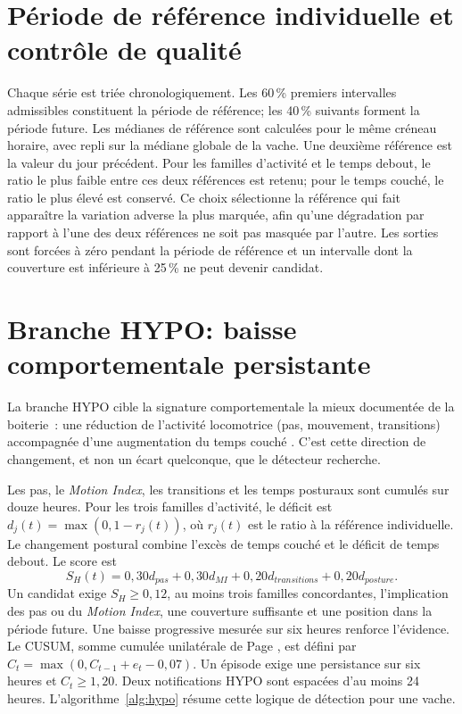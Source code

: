 \section{Période de référence individuelle et contrôle de qualité}

Chaque série est triée chronologiquement. Les 60\,\% premiers intervalles admissibles
constituent la période de référence; les 40\,\% suivants forment la période future. Les médianes de
référence sont calculées pour le même créneau horaire, avec repli sur la médiane globale de
la vache. Une deuxième référence est la valeur du jour précédent. Pour les familles
d'activité et le temps debout, le ratio le plus faible entre ces deux références est retenu;
pour le temps couché, le ratio le plus élevé est conservé. Ce choix sélectionne la référence
qui fait apparaître la variation adverse la plus marquée, afin qu'une dégradation par rapport
à l'une des deux références ne soit pas masquée par l'autre. Les sorties sont forcées
à zéro pendant la période de référence et un intervalle dont la couverture est inférieure à 25\,\% ne
peut devenir candidat.

\section{Branche HYPO: baisse comportementale persistante}
\label{sec:hypo}

La branche HYPO cible la signature comportementale la mieux documentée de la boiterie~: une
réduction de l'activité locomotrice (pas, mouvement, transitions) accompagnée d'une
augmentation du temps couché \citep{ito2010lying,blackie2011lying,chapinal2010measurement}.
C'est cette direction de changement, et non un écart quelconque, que le détecteur recherche.

Les pas, le \textit{Motion Index}, les transitions et les temps posturaux sont cumulés sur
douze heures. Pour les trois familles d'activité, le déficit est
\(
d_j(t)=\max(0,1-r_j(t))
\), où \(r_j(t)\) est le ratio à la référence individuelle. Le changement postural combine
l'excès de temps couché et le déficit de temps debout. Le score est
\[
S_H(t)=0{,}30d_{pas}+0{,}30d_{MI}+0{,}20d_{transitions}+0{,}20d_{posture}.
\]
Un candidat exige \(S_H\geq0{,}12\), au moins trois familles concordantes, l'implication des
pas ou du \textit{Motion Index}, une couverture suffisante et une position dans la période future.
Une baisse progressive mesurée sur six heures renforce l'évidence. Le CUSUM, somme cumulée unilatérale de Page \citep{page1954continuous}, est défini par
\(C_t=\max(0,C_{t-1}+e_t-0{,}07)\). Un épisode exige une persistance sur six heures et
\(C_t\geq1{,}20\). Deux notifications HYPO sont espacées d'au moins 24 heures. L'algorithme~\ref{alg:hypo}
résume cette logique de détection pour une vache.

